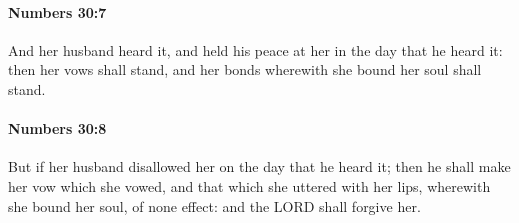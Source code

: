 		\paragraph{Numbers 30:7} %
			\label{NUMBERS-30-7}

			And her husband heard it, and held his peace at her in the day that he heard it: then her vows shall stand, and her bonds wherewith she bound her soul shall stand.


		\paragraph{Numbers 30:8} %
			\label{NUMBERS-30-8}

			But if her husband disallowed her on the day that he heard it; then he shall make her vow which she vowed, and that which she uttered with her lips, wherewith she bound her soul, of none effect: and the LORD shall forgive her.


